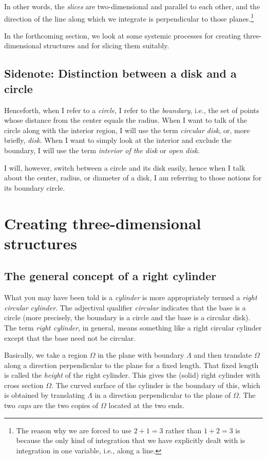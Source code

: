 \documentclass[10pt]{amsart}
\begin{document}
In other words, the {\em slices} are two-dimensional and parallel to
each other, and the direction of the line along which we integrate is
perpendicular to those planes.\footnote{The reason why we are forced
to use $2 + 1 = 3$ rather than $1 + 2 = 3$ is because the only kind of
integration that we have explicitly dealt with is integration in one
variable, i.e., along a line.}

In the forthcoming section, we look at some systemic processes for
creating three-dimensional structures and for slicing them suitably.

\subsection*{Sidenote: Distinction between a disk and a circle}

Henceforth, when I refer to a {\em circle}, I refer to the {\em
boundary}, i.e., the set of points whose distance from the center
equals the radius. When I want to talk of the circle along with the
interior region, I will use the term {\em circular disk}, or, more
briefly, {\em disk}. When I want to simply look at the interior and
exclude the boundary, I will use the term {\em interior of the disk}
or {\em open disk}.

I will, however, switch between a circle and its disk easily, hence
when I talk about the center, radius, or diameter of a disk, I am
referring to those notions for its boundary circle.

\section{Creating three-dimensional structures}

\subsection{The general concept of a right cylinder}

What you may have been told is a {\em cylinder} is more appropriately
termed a {\em right circular cylinder}. The adjectival qualifier {\em
circular} indicates that the base is a circle (more precisely, the
boundary is a circle and the base is a circular disk). The term {\em
right cylinder}, in general, means something like a right circular
cylinder except that the base need not be circular.

Basically, we take a region $\Omega$ in the plane with boundary
$\Lambda$ and then translate $\Omega$ along a direction perpendicular
to the plane for a fixed length. That fixed length is called the {\em
height} of the right cylinder. This gives the (solid) right cylinder
with cross section $\Omega$. The curved surface of the cylinder is the
boundary of this, which is obtained by translating $\Lambda$ in a
direction perpendicular to the plane of $\Omega$. The two {\em caps}
are the two copies of $\Omega$ located at the two ends.
\end{document}
